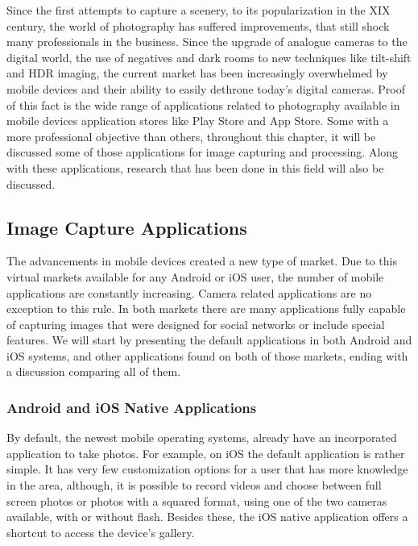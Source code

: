 Since the first attempts to capture a scenery, to its popularization in the XIX century, the world of photography has suffered improvements, that still shock many professionals in the business. Since the upgrade of analogue cameras to the digital world, the use of negatives and dark rooms to new techniques like tilt-shift and HDR imaging, the current market has been increasingly overwhelmed by mobile devices and their ability to easily dethrone today's digital cameras. Proof of this fact is the wide range of applications related to photography available in mobile devices application stores like Play Store and App Store. Some with a more professional objective than others, throughout this chapter, it will be discussed some of those applications for image capturing and processing. Along with these applications, research that has been done in this field will also be discussed.

\subsection{Image Capture Applications}

The advancements in mobile devices created a new type of market. Due to this virtual markets available for any Android or iOS user, the number of mobile applications are constantly increasing. Camera related applications are no exception to this rule. In both markets there are many applications fully capable of capturing images that were designed for social networks or include special features. We will start by presenting the default applications in both Android and iOS systems, and other applications found on both of those markets, ending with a discussion comparing all of them.

\subsubsection{Android and iOS Native Applications}

By default, the newest mobile operating systems, already have an incorporated application to take photos. For example, on iOS the default application is rather simple. It has very few customization options for a user that has more knowledge in the area, although, it is possible to record videos and choose between full screen photos or photos with a squared format, using one of the two cameras available, with or without flash. Besides these, the iOS native application offers a shortcut to access the device's gallery.

